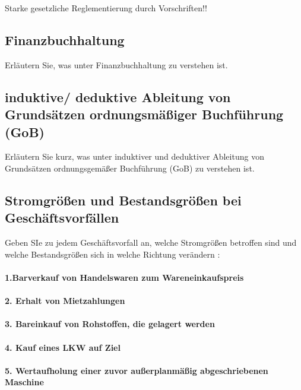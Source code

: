 \documentclass[paper=a4, fontsize=11pt]{scrartcl}
\numberwithin{equation}{section}
\numberwithin{figure}{section}
\numberwithin{table}{section}
\begin{document}
Starke gesetzliche Reglementierung durch Vorschriften!!
\subsection{Finanzbuchhaltung}
Erläutern Sie, was unter Finanzbuchhaltung zu verstehen ist. \\
\subsection{induktive/ deduktive Ableitung von Grundsätzen ordnungsmäßiger Buchführung (GoB)}
Erläutern Sie kurz, was unter induktiver und deduktiver Ableitung von Grundsätzen ordnungsgemäßer Buchführung (GoB) zu verstehen ist. \\
\subsection{Stromgrößen und Bestandsgrößen bei Geschäftsvorfällen}
Geben SIe zu jedem Geschäftsvorfall an, welche Stromgrößen betroffen sind und welche Bestandsgrößen sich in welche Richtung verändern : \\

\paragraph{1.Barverkauf von Handelswaren zum Wareneinkaufspreis}

\paragraph{2. Erhalt von Mietzahlungen}

\paragraph{3. Bareinkauf von Rohstoffen, die gelagert werden}

\paragraph{4. Kauf eines LKW auf Ziel}

\paragraph{5. Wertaufholung einer zuvor außerplanmäßig abgeschriebenen Maschine}
\end{document}
